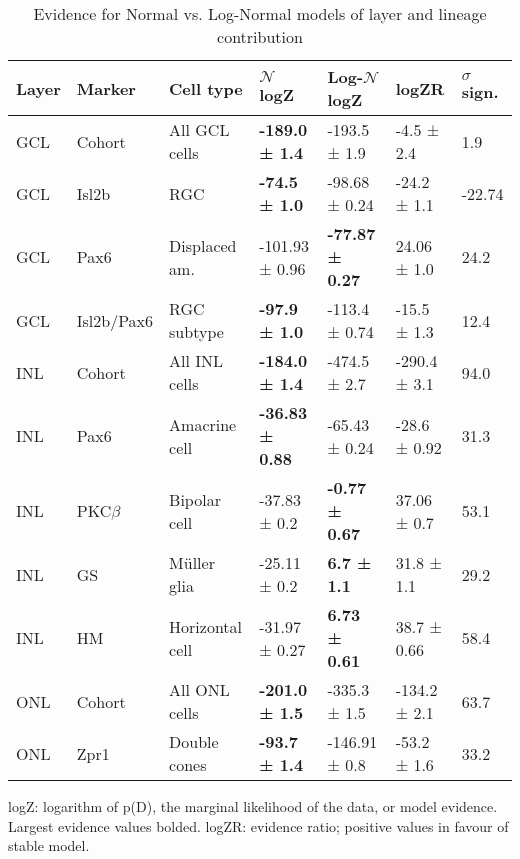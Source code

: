 \begin{table}[!ht]
    \caption{Evidence for Normal vs. Log-Normal models of layer and lineage contribution}
    \begin{tabular}{|l|l|l|l|l|l|l|} 
        \hline
        {\bf Layer} & {\bf Marker} & {\bf Cell type} & {\bf $\mathcal{N}$ logZ} & {\bf Log-$\mathcal{N}$ logZ} & {\bf logZR} & {\bf $\sigma$ sign.}\\ \hline \hline
        GCL & Cohort & All GCL cells & {\bf -189.0 ± 1.4} & -193.5 ± 1.9 & -4.5 ± 2.4 & 1.9\\ \hline \hline
        GCL & Isl2b & RGC & {\bf -74.5 ± 1.0} & -98.68 ± 0.24 & -24.2 ± 1.1 & -22.74\\ \hline
        GCL & Pax6 & Displaced am. & -101.93 ± 0.96 & {\bf -77.87 ± 0.27} & 24.06 ± 1.0 & 24.2\\ \hline
        GCL & Isl2b/Pax6 & RGC subtype & {\bf -97.9 ± 1.0} & -113.4 ± 0.74 & -15.5 ± 1.3 & 12.4\\ \hline \hline
        INL & Cohort & All INL cells & {\bf -184.0 ± 1.4} & -474.5 ± 2.7 & -290.4 ± 3.1 & 94.0\\ \hline \hline
        INL & Pax6 & Amacrine cell & {\bf -36.83 ± 0.88} & -65.43 ± 0.24 & -28.6 ± 0.92 & 31.3\\ \hline
        INL & PKC$\beta$ & Bipolar cell & -37.83 ± 0.2 & {\bf -0.77 ± 0.67} & 37.06 ± 0.7 & 53.1\\ \hline
        INL & GS & M\"{u}ller glia & -25.11 ± 0.2 & {\bf 6.7 ± 1.1} & 31.8 ± 1.1 & 29.2\\ \hline
        INL & HM & Horizontal cell & -31.97 ± 0.27 & {\bf 6.73 ± 0.61} & 38.7 ± 0.66 & 58.4\\ \hline \hline
        ONL & Cohort & All ONL cells & {\bf -201.0 ± 1.5} & -335.3 ± 1.5 & -134.2 ± 2.1 & 63.7\\ \hline \hline
        ONL & Zpr1 & Double cones & {\bf -93.7 ± 1.4} & -146.91 ± 0.8 & -53.2 ± 1.6 & 33.2\\ \hline
    \end{tabular}
   
    \begin{flushleft}logZ: logarithm of p(D), the marginal likelihood of the data, or model evidence.  Largest evidence values bolded. logZR: evidence ratio; positive values in favour of stable model.
    \end{flushleft}
    \label{lineage_nlnev}
\end{table}

